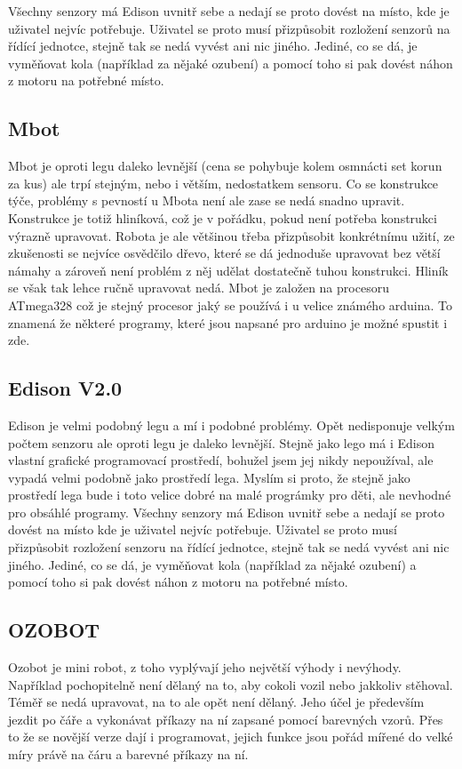 \documentclass{template/socthesis}
\begin{document}
Všechny senzory má Edison uvnitř sebe a nedají se proto dovést na místo, kde je uživatel nejvíc potřebuje. Uživatel se proto musí přizpůsobit rozložení senzorů na řídící jednotce, stejně tak se nedá vyvést ani nic jiného. Jediné, co se dá, je vyměňovat kola (například za nějaké ozubení) a pomocí toho si pak dovést náhon z motoru na potřebné místo.


\subsection{Mbot}
Mbot je oproti legu daleko levnější (cena se pohybuje kolem osmnácti set korun za kus) ale trpí stejným, nebo i větším, nedostatkem sensoru. Co se konstrukce týče, problémy s pevností u Mbota není ale zase se nedá snadno upravit. Konstrukce je totiž hliníková, což je v pořádku, pokud není potřeba konstrukci výrazně upravovat. Robota je ale většinou třeba přizpůsobit konkrétnímu užití, ze zkušenosti se nejvíce osvědčilo dřevo, které se dá jednoduše upravovat bez větší námahy a zároveň není problém z něj udělat dostatečně tuhou konstrukci. Hliník se však tak lehce ručně upravovat nedá. Mbot je založen na procesoru ATmega328 což je stejný procesor jaký se používá i u velice známého arduina. To znamená že některé programy, které jsou napsané pro arduino je možné spustit i zde.

\subsection{Edison V2.0}
Edison je velmi podobný legu a mí i podobné problémy. Opět nedisponuje velkým počtem senzoru ale oproti legu je daleko levnější. Stejně jako lego má i Edison vlastní grafické programovací prostředí, bohužel jsem jej nikdy nepoužíval, ale vypadá velmi podobně jako prostředí lega. Myslím si proto, že stejně jako prostředí lega bude i toto velice dobré na malé prográmky pro děti, ale nevhodné pro obsáhlé programy. Všechny senzory má Edison uvnitř sebe a nedají se proto dovést na místo kde je uživatel nejvíc potřebuje. Uživatel se proto musí přizpůsobit rozložení senzoru na řídící jednotce, stejně tak se nedá vyvést ani nic jiného. Jediné, co se dá, je vyměňovat kola (například za nějaké ozubení) a pomocí toho si pak dovést náhon z motoru na potřebné místo.


\subsection{OZOBOT}
Ozobot je mini robot, z toho vyplývají jeho největší výhody i nevýhody. Například pochopitelně není dělaný na to, aby cokoli vozil nebo jakkoliv stěhoval. Téměř se nedá upravovat, na to ale opět není dělaný. Jeho účel je především jezdit po čáře a vykonávat příkazy na ní zapsané pomocí barevných vzorů. Přes to že se novější verze dají i programovat, jejich funkce jsou pořád mířené do velké míry právě na čáru a barevné příkazy na ní.
\end{document}
